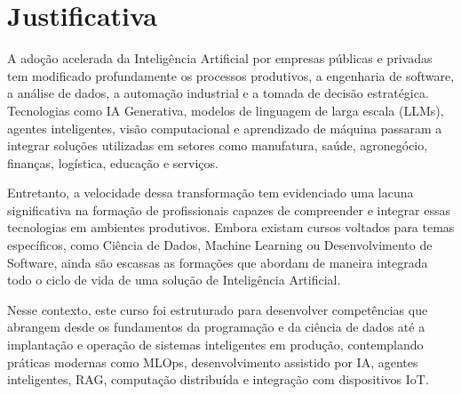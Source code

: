 \chapter{Justificativa}
\pagestyle{plain}

A adoção acelerada da Inteligência Artificial por empresas públicas e privadas tem modificado profundamente os processos produtivos, a engenharia de software, a análise de dados, a automação industrial e a tomada de decisão estratégica. Tecnologias como IA Generativa, modelos de linguagem de larga escala (LLMs), agentes inteligentes, visão computacional e aprendizado de máquina passaram a integrar soluções utilizadas em setores como manufatura, saúde, agronegócio, finanças, logística, educação e serviços.

Entretanto, a velocidade dessa transformação tem evidenciado uma lacuna significativa na formação de profissionais capazes de compreender e integrar essas tecnologias em ambientes produtivos. Embora existam cursos voltados para temas específicos, como Ciência de Dados, Machine Learning ou Desenvolvimento de Software, ainda são escassas as formações que abordam de maneira integrada todo o ciclo de vida de uma solução de Inteligência Artificial.

Nesse contexto, este curso foi estruturado para desenvolver competências que abrangem desde os fundamentos da programação e da ciência de dados até a implantação e operação de sistemas inteligentes em produção, contemplando práticas modernas como MLOps, desenvolvimento assistido por IA, agentes inteligentes, RAG, computação distribuída e integração com dispositivos IoT.
